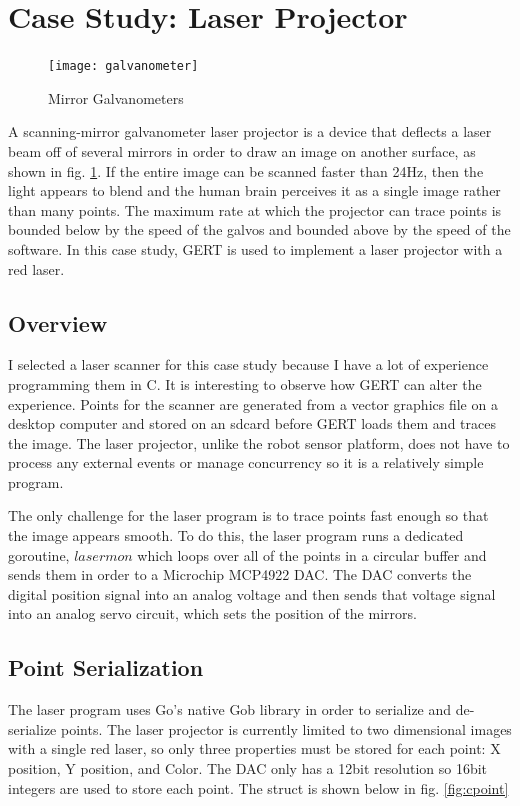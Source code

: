 \section{Case Study: Laser Projector}\label{sec:laser}
\begin{figure}[h]
\begin{center}
  \texttt{[image: galvanometer]}
\end{center}
  \caption{Mirror Galvanometers} \label{fig:galvos}
\end{figure}

A scanning-mirror galvanometer laser projector is a device that deflects a laser beam off of several mirrors in
order to draw an image on another surface, as shown in fig. \ref{fig:galvos}. If the entire image can be scanned faster than 24Hz, then the light appears
to blend and the human brain perceives it as a single image rather than many points. The maximum rate at which the
projector can trace points is bounded below by the speed of the galvos and bounded above by the speed of the software.
In this case study, GERT is used to implement a laser projector with a red laser.

\subsection{Overview}
I selected a laser scanner for this case study because I have a lot of experience programming
them in C. It is interesting to observe how GERT can alter the experience.
Points for the scanner are generated from a vector graphics file on a desktop computer and stored
on an sdcard before GERT loads them and traces the image. The laser projector,
unlike the robot sensor platform, does not have to process any external events or
manage concurrency so it is a relatively simple program.

The only challenge for the laser program is to trace points fast enough so that the image appears smooth.
To do this, the laser program runs a dedicated goroutine, $lasermon$ which loops over all of the points
in a circular buffer and sends them in order to a Microchip MCP4922 DAC. The
DAC converts the digital position signal into an analog voltage and then
sends that voltage signal into an analog servo circuit, which sets the position
of the mirrors.

\subsection{Point Serialization}
The laser program uses Go's native Gob library in order to serialize and
de-serialize points. The laser projector is currently limited to
two dimensional images with a single red laser, so only three
properties must be stored for each point: X position, Y position,
and Color. The DAC only has a 12bit resolution so 16bit integers are used
to store each point. The struct is shown below in fig. \ref{fig:cpoint}

